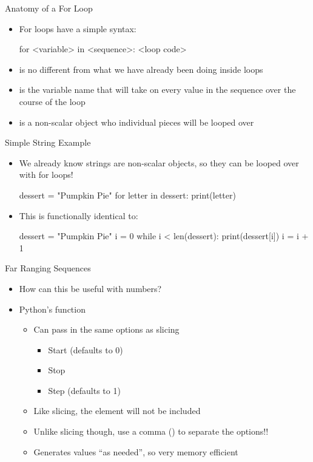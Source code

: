 \documentclass[pdf, aspectratio=169, 12pt]{beamer}
\begin{document}
\begin{frame}[fragile]{Anatomy of a For Loop}
	\begin{itemize}[<+->]
		\item For loops have a simple syntax:
			\begin{pythoncode}
				for <variable> in <sequence>:
					<loop code>
			\end{pythoncode}
		\item {} is no different from what we have already been doing inside loops
		\item {} is the variable name that will take on every value in the sequence over the course of the loop
		\item {} is a non-scalar object who individual pieces will be looped over
	\end{itemize}
\end{frame}

\begin{frame}[fragile]{Simple String Example}
	\vspace{5mm}
	\begin{itemize}
		\item We already know strings are non-scalar objects, so they can be looped over with for loops!
			\begin{pythoncode}
				dessert = "Pumpkin Pie"
				for letter in dessert:
					print(letter)
			\end{pythoncode}
		\item This is functionally identical to:
			\begin{pythoncode}
				dessert = "Pumpkin Pie"
				i = 0
				while i < len(dessert):
					print(dessert[i])
					i = i + 1
			\end{pythoncode}
	\end{itemize}
\end{frame}

\begin{frame}{Far Ranging Sequences}
	\begin{itemize}
		\item How can this be useful with numbers?
		\item Python's  function
			\begin{itemize}
				\item Can pass in the same options as slicing
					\begin{itemize}
						\item Start (defaults to 0)
						\item Stop
						\item Step (defaults to 1)
					\end{itemize}
				\item Like slicing, the  element will not be included
				\item Unlike slicing though, use a comma (\pyi{,}) to separate the options!!
				\item Generates values ``as needed'', so very memory efficient
			\end{itemize}
	\end{itemize}
\end{frame}
\end{document}
